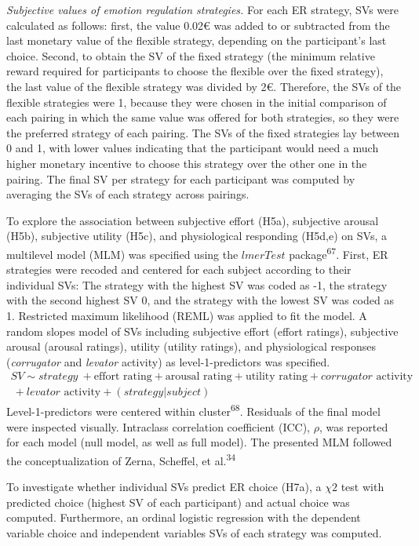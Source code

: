 \documentclass[
  man,floatsintext]{apa6}
\begin{document}
\emph{Subjective values of emotion regulation strategies.} For each ER strategy, SVs were calculated as follows: first, the value 0.02€ was added to or subtracted from the last monetary value of the flexible strategy, depending on the participant's last choice.
Second, to obtain the SV of the fixed strategy (the minimum relative reward required for participants to choose the flexible over the fixed strategy), the last value of the flexible strategy was divided by 2€.
Therefore, the SVs of the flexible strategies were 1, because they were chosen in the initial comparison of each pairing in which the same value was offered for both strategies, so they were the preferred strategy of each pairing.
The SVs of the fixed strategies lay between 0 and 1, with lower values indicating that the participant would need a much higher monetary incentive to choose this strategy over the other one in the pairing.
The final SV per strategy for each participant was computed by averaging the SVs of each strategy across pairings.

To explore the association between subjective effort (H5a), subjective arousal (H5b), subjective utility (H5c), and physiological responding (H5d,e) on SVs, a multilevel model (MLM) was specified using the \(lmerTest\) package\textsuperscript{67}.
First, ER strategies were recoded and centered for each subject according to their individual SVs: The strategy with the highest SV was coded as -1, the strategy with the second highest SV 0, and the strategy with the lowest SV was coded as 1.
Restricted maximum likelihood (REML) was applied to fit the model.
A random slopes model of SVs including subjective effort (effort ratings), subjective arousal (arousal ratings), utility (utility ratings), and physiological responses (\emph{corrugator} and \emph{levator} activity) as level-1-predictors was specified.
\[
\begin{split}
SV \sim strategy\ + \text{effort rating} + \text{arousal rating} + \text{utility rating} + corrugator \text{ activity} \\\ + levator \text{ activity} + (strategy|subject)
\end{split}
\]
Level-1-predictors were centered within cluster\textsuperscript{68}.
Residuals of the final model were inspected visually.
Intraclass correlation coefficient (ICC), \(\rho\), was reported for each model (null model, as well as full model).
The presented MLM followed the conceptualization of Zerna, Scheffel, et al.\textsuperscript{34}

To investigate whether individual SVs predict ER choice (H7a), a \(\chi{2}\) test with predicted choice (highest SV of each participant) and actual choice was computed.
Furthermore, an ordinal logistic regression with the dependent variable choice and independent variables SVs of each strategy was computed.
\end{document}

